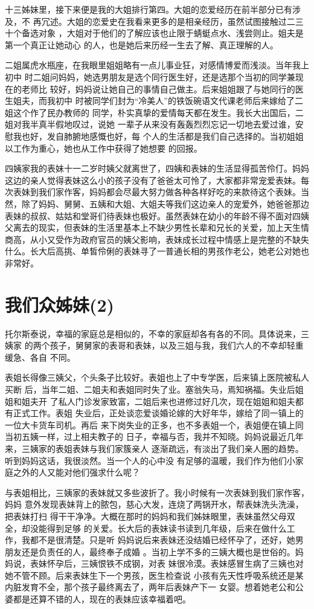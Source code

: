 \documentclass[12pt]{book}
\begin{document}
十三姊妹里，接下来便是我的大姐排行第四。大姐的恋爱经历在前半部分已有涉及，不
再冗述。大姐的恋爱史在我看来更多的是相亲经历，虽然试图接触过二三十个备选对象
，大姐对于他们的了解应该也止限于蜻蜓点水、浅尝则止。姐夫是第一个真正让她动心
的人，也是她后来历经一生去了解、真正理解的人。

二姐属虎水瓶座，在我眼里姐姐略有一点儿事业狂，对感情博爱而浅淡。当年我上初中
时二姐问妈妈，她选男朋友是选个同行医生好，还是选那个当初的同学兼现在的老师比
较好，妈妈说让她自己的事情自己做主。后来姐姐跟了与她同行的医生姐夫，而我初中
时被同学们封为“冷美人”的铁饭碗语文代课老师后来嫁给了二姐这个作了民办教师的
同学，朴实真挚的爱情每天都在发生。我长大出国后，二姐对我半真半假地叹过，说她
一辈子从来没有轰轰烈烈忘记一切地去爱过谁，安慰我也好，发自肺腑地感慨也好，每
个人的生活都是我们自己选择的。当初姐姐以工作为重心，她也从工作中获得了她想要
的回报。

四姨家我的表妹十一二岁时姨父就离世了，四姨和表妹的生活显得孤苦伶仃。妈妈这边的亲人觉得表妹这么小的孩子没有了爸爸太可怜了，大家都非常宠爱表妹。每次表妹到我们家作客，妈妈都会尽最大努力做各种各样好吃的来款待这个表妹。当然，除了妈妈、舅舅、五姨和大姐、大姐夫等我们这边亲人的宠爱外，她爸爸那边表妹的叔叔、姑姑和堂哥们待表妹也极好。虽然表妹在幼小的年龄不得不面对四姨父离去的现实，但表妹的生活里基本上不缺少男性长辈和兄长的关爱，加上天生情商高，从小又受作为政府官员的姨父影响，表妹成长过程中情感上是完整的不缺失什么。长大后高挑、单皙伶俐的表妹寻了一普通长相的男孩作老公，她老公对她也非常好。
\section{我们众姊妹(2)}
\label{sec-9-20}

托尔斯泰说，幸福的家庭总是相似的，不幸的家庭却各有各的不同。具体说来，三姨家
的两个孩子，舅舅家的表哥和表妹，以及三姐与我，我们六人的不幸却轻重缓急、各自
不同。

表姐长得像三姨父，个头条子比较好。表姐也上了中专学医，后来镇上医院被私人买断
后，当年二姐、二姐夫和表姐同时失了业。塞翁失马，焉知祸福。失业后姐姐和姐夫开
了私人门诊发家致富，二姐后来也进修过好几次，现在姐姐和姐夫都有正式工作。表姐
失业后，正处谈恋爱谈婚论嫁的大好年华，嫁给了同一镇上的一位大卡货车司机。再后
来下岗失业的正多，也不多表姐一个，表姐便在镇上同当初五姨一样，过上相夫教子的
日子，幸福与否，我并不知晓。妈妈说最近几年来，三姨家的表姐表妹与我们家簇亲人
逐渐疏远，有淡出了我们亲人圈的趋势。听到妈妈这话，我很淡然。当一个人的心中没
有足够的温暖，我们作为他们小家庭之外的人又能对他们强求什么呢？

与表姐相比，三姨家的表妹就又多些波折了。我小时候有一次表妹到我们家作客，妈妈
意外发现表妹背上的脓包，慈心大发，连烧了两锅开水，帮表妹洗头洗澡，把表妹打扫
得干干净净。大概在那时的妈妈和我们姊妹眼里，表妹虽然父母双全，却没能得到足够
的关爱。长大后的表妹读书读到几年级，后来在做什么工作，我都不是很清楚。只是听
妈妈说后来表妹还没结婚已经怀孕了，还好，她男朋友还是负责任的人，最终奉子成婚
。当初上学不多的三姨大概也是世俗的。妈妈说，表妹怀孕后，三姨恨铁不成钢，对表
妹很冷漠。表妹感冒生病了三姨也对她不管不顾。后来表妹生下一个男孩，医生检查说
小孩有先天性呼吸系统还是某内脏发育不全，那个孩子最终离去了，两年后表妹产下一
女婴。想着她老公和公婆都是还算不错的人，现在的表妹应该幸福着吧。
\end{document}
